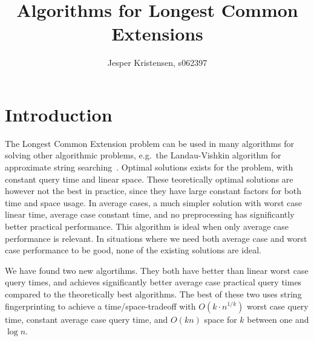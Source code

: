 \documentclass[a4]{article}
\title{Algorithms for Longest Common Extensions}
\author{Jesper Kristensen, s062397}
\begin{document}
\newif\ifarticle
\newif\ifreport

\reporttrue

\maketitle

\newcommand{\sortt}{\textit{sort}(n,\sigma)}
\newcommand{\LCE}{\textit{LCE}}
\newcommand{\NCA}{\textit{NCA}}
\newcommand{\RMQ}{\textit{RMQ}}
\newcommand{\SA}{\textit{SA}}
\newcommand{\SAinv}{\textit{SA}^{-1}} %
\newcommand{\SAi}{SA$^{-1}$} %
\newcommand{\LCP}{\textit{LCP}}
\newcommand{\suff}{\textit{suff}}
\newcommand{\logceil}{\lceil\log n\rceil}
\newcommand{\fprint}[1][k]{\ensuremath{\proc{Fingerprint}_{#1}}}
\newcommand{\fprintk}{\fprint[k]}
\newcommand{\RMQpq}[2]{RMQ\textless$#1$, $#2$\textgreater}
\newcommand{\RMQn}{\RMQpq{1}{n}}
\newcommand{\RMQq}{\RMQpq{n}{1}}
\newcommand{\RMQlog}{\RMQpq{n}{\log n}}

\tableofcontents

\vspace{1cm}

\newpage

\section{Introduction\label{sec:intro}}

The Longest Common Extension problem can be used in many algorithms for solving other algorithmic problems, e.g.\ the Landau-Vishkin algorithm for approximate string searching~\cite{approx-search}. Optimal solutions exists for the problem, with constant query time and linear space. These teoretically optimal solutions are however not the best in practice, since they have large constant factors for both time and space usage. In average cases, a much simpler solution with worst case linear time, average case constant time, and no preprocessing has significantly better practical performance. This algorithm is ideal when only average case performance is relevant. In situations where we need both average case and worst case performance to be good, none of the existing solutions are ideal.

We have found two new algortihms. They both have better than linear worst case query times, and achieves significantly better average case practical query times compared to the theoretically best algorithms. The best of these two uses string fingerprinting to achieve a time/space-tradeoff with $O(k\cdot n^{1/k})$ worst case query time, constant average case query time, and $O(kn)$ space for $k$ between one and $\log n$.
\end{document}
